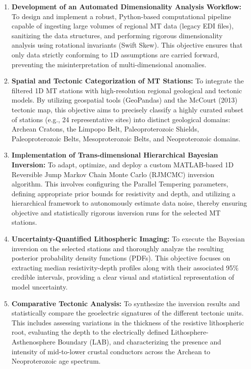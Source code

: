 \begin{enumerate}
    \item \textbf{Development of an Automated Dimensionality Analysis Workflow:} To design and implement a robust, Python-based computational pipeline capable of ingesting large volumes of regional MT data (legacy EDI files), sanitizing the data structures, and performing rigorous dimensionality analysis using rotational invariants (Swift Skew). This objective ensures that only data strictly conforming to 1D assumptions are carried forward, preventing the misinterpretation of multi-dimensional anomalies.
    
    \item \textbf{Spatial and Tectonic Categorization of MT Stations:} To integrate the filtered 1D MT stations with high-resolution regional geological and tectonic models. By utilizing geospatial tools (GeoPandas) and the McCourt (2013) tectonic map, this objective aims to precisely classify a highly curated subset of stations (e.g., 24 representative sites) into distinct geological domains: Archean Cratons, the Limpopo Belt, Paleoproterozoic Shields, Paleoproterozoic Belts, Mesoproterozoic Belts, and Neoproterozoic domains.
    
    \item \textbf{Implementation of Trans-dimensional Hierarchical Bayesian Inversion:} To adapt, optimize, and deploy a custom MATLAB-based 1D Reversible Jump Markov Chain Monte Carlo (RJMCMC) inversion algorithm. This involves configuring the Parallel Tempering parameters, defining appropriate prior bounds for resistivity and depth, and utilizing a hierarchical framework to autonomously estimate data noise, thereby ensuring objective and statistically rigorous inversion runs for the selected MT stations.
    
    \item \textbf{Uncertainty-Quantified Lithospheric Imaging:} To execute the Bayesian inversion on the selected stations and thoroughly analyze the resulting posterior probability density functions (PDFs). This objective focuses on extracting median resistivity-depth profiles along with their associated 95\% credible intervals, providing a clear visual and statistical representation of model uncertainty.
    
    \item \textbf{Comparative Tectonic Analysis:} To synthesize the inversion results and statistically compare the geoelectric signatures of the different tectonic units. This includes assessing variations in the thickness of the resistive lithospheric root, evaluating the depth to the electrically defined Lithosphere-Asthenosphere Boundary (LAB), and characterizing the presence and intensity of mid-to-lower crustal conductors across the Archean to Neoproterozoic age spectrum.
\end{enumerate}

